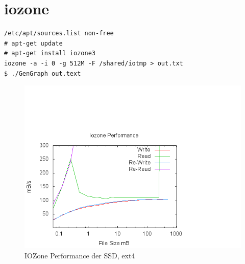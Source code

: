 \section{iozone}
\begin{lstlisting}[style=Bash]
/etc/apt/sources.list non-free
# apt-get update
# apt-get install iozone3
iozone -a -i 0 -g 512M -F /shared/iotmp > out.txt
$ ./GenGraph out.text
\end{lstlisting}
\begin{figure}[H]
	\centering
	\includegraphics[scale=1.24]{iozone.png}
	\caption{IOZone Performance der SSD, ext4}
\end{figure}
